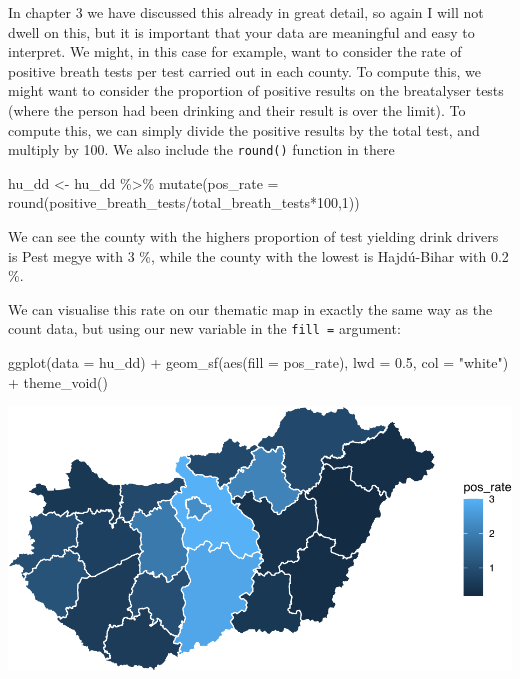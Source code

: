 \documentclass[
]{book}
\newenvironment{Shaded}{\begin{snugshade}}{\end{snugshade}}
\newcommand{\AttributeTok}[1]{\textcolor[rgb]{0.77,0.63,0.00}{#1}}
\newcommand{\DecValTok}[1]{\textcolor[rgb]{0.00,0.00,0.81}{#1}}
\newcommand{\FloatTok}[1]{\textcolor[rgb]{0.00,0.00,0.81}{#1}}
\newcommand{\FunctionTok}[1]{\textcolor[rgb]{0.00,0.00,0.00}{#1}}
\newcommand{\NormalTok}[1]{#1}
\newcommand{\OtherTok}[1]{\textcolor[rgb]{0.56,0.35,0.01}{#1}}
\newcommand{\SpecialCharTok}[1]{\textcolor[rgb]{0.00,0.00,0.00}{#1}}
\newcommand{\StringTok}[1]{\textcolor[rgb]{0.31,0.60,0.02}{#1}}
\begin{document}
In chapter 3 we have discussed this already in great detail, so again I will not dwell on this, but it is important that your data are meaningful and easy to interpret. We might, in this case for example, want to consider the rate of positive breath tests per test carried out in each county. To compute this, we might want to consider the proportion of positive results on the breatalyser tests (where the person had been drinking and their result is over the limit). To compute this, we can simply divide the positive results by the total test, and multiply by 100. We also include the \texttt{round()} function in there

\begin{Shaded}
\begin{Highlighting}[]
\NormalTok{hu\_dd }\OtherTok{\textless{}{-}}\NormalTok{ hu\_dd }\SpecialCharTok{\%\textgreater{}\%} 
  \FunctionTok{mutate}\NormalTok{(}\AttributeTok{pos\_rate =} \FunctionTok{round}\NormalTok{(positive\_breath\_tests}\SpecialCharTok{/}\NormalTok{total\_breath\_tests}\SpecialCharTok{*}\DecValTok{100}\NormalTok{,}\DecValTok{1}\NormalTok{))}
\end{Highlighting}
\end{Shaded}

We can see the county with the highers proportion of test yielding drink drivers is Pest megye with 3 \%, while the county with the lowest is Hajdú-Bihar with 0.2 \%.

We can visualise this rate on our thematic map in exactly the same way as the count data, but using our new variable in the \texttt{fill\ =} argument:

\begin{Shaded}
\begin{Highlighting}[]
\FunctionTok{ggplot}\NormalTok{(}\AttributeTok{data =}\NormalTok{ hu\_dd) }\SpecialCharTok{+} 
  \FunctionTok{geom\_sf}\NormalTok{(}\FunctionTok{aes}\NormalTok{(}\AttributeTok{fill =}\NormalTok{ pos\_rate), }\AttributeTok{lwd =} \FloatTok{0.5}\NormalTok{, }\AttributeTok{col =} \StringTok{"white"}\NormalTok{) }\SpecialCharTok{+} 
  \FunctionTok{theme\_void}\NormalTok{()}
\end{Highlighting}
\end{Shaded}

\includegraphics{crime_mapping_files/figure-latex/themmapratefill-1.pdf}
\end{document}
